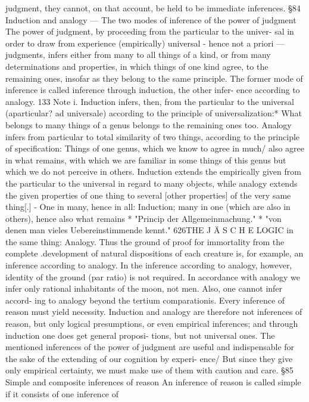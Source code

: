 judgment, they cannot, on that account, be held to be immediate inferences.
§84
Induction and analogy — The two modes of inference of the power of
judgment
The power of judgment, by proceeding from the particular to the univer-
sal in order to draw from experience (empirically) universal - hence not a
priori — judgments, infers either from many to all things of a kind, or from
many determinations and properties, in which things of one kind agree, to
the remaining ones, insofar as they belong to the same principle. The former
mode of inference is called inference through induction, the other infer-
ence according to analogy.
133
Note i. Induction infers, then, from the particular to the universal (aparticular? ad
universale) according to the principle of universalization:* What belongs to
many things of a genus belongs to the remaining ones too. Analogy infers from
particular to total similarity of two things, according to the principle of
specification: Things of one genus, which we know to agree in much/ also
agree in what remains, with which we are familiar in some things of this
genus but which we do not perceive in others. Induction extends the
empirically given from the particular to the universal in regard to many
objects, while analogy extends the given properties of one thing to several
[other properties] of the very same thing[.] - One in many, hence in all:
Induction; many in one (which are also in others), hence also what remains
* "Princip der Allgemeinmachung."
* "von denen man vieles Uebereinstimmende kennt."
626THE J Ä S C H E LOGIC
in the same thing: Analogy. Thus the ground of proof for immortality
from the complete .development of natural dispositions of each creature
is, for example, an inference according to analogy.
In the inference according to analogy, however, identity of the ground
(par ratio) is not required. In accordance with analogy we infer only
rational inhabitants of the moon, not men. Also, one cannot infer accord-
ing to analogy beyond the tertium comparationis.
Every inference of reason must yield necessity. Induction and analogy are
therefore not inferences of reason, but only logical presumptions, or even
empirical inferences; and through induction one does get general proposi-
tions, but not universal ones.
The mentioned inferences of the power of judgment are useful and
indispensable for the sake of the extending of our cognition by experi-
ence/ But since they give only empirical certainty, we must make use of
them with caution and care.
§85
Simple and composite inferences of reason
An inference of reason is called simple if it consists of one inference of

